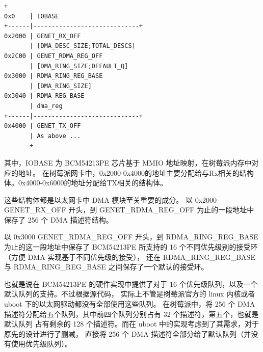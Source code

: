     \begin{minipage}[t]{0.42\linewidth}
    \begin{lstlisting}[columns=fullflexible, label={fig::uboot-genet-struct}]       +
0x0    | IOBASE
+------|-----------------------------+
0x2000 | GENET_RX_OFF
       | [DMA_DESC_SIZE;TOTAL_DESCS]
0x2C00 | GENET_RDMA_REG_OFF
       | [DMA_RING_SIZE;DEFAULT_Q]
0x3000 | RDMA_RING_REG_BASE
       | [DMA_RING_SIZE]
0x3040 | RDMA_REG_BASE
       | dma_reg
+------|-----------------------------+
0x4000 | GENET_TX_OFF
       | As above ...
       +
        \end{lstlisting}
    \end{minipage}
    \quad
    \begin{minipage}[t]{0.5\linewidth}
        \vspace{2em}
        \setlength{\parindent}{1em}
        其中，IOBASE 为 BCM54213PE 芯片基于 MMIO 地址映射，在树莓派内存中对应的地址。
        在树莓派网卡中，0x2000-0x4000的地址主要分配给与Rx相关的结构体。0x4000-0x6000的地址分配给TX相关的结构体。

        这些结构体都是以太网卡中 DMA 模块至关重要的成分。
        以 0x2000 GENET\_RX\_OFF 开头，到 GENET\_RDMA\_REG\_OFF 为止的一段地址中保存了 256 个 DMA 描述符结构。
    \end{minipage}

    以 0x3000 GENET\_RDMA\_REG\_OFF 开头，到 RDMA\_RING\_REG\_BASE 为止的这一段地址中保存了 BCM54213PE 
    所支持的 16 个不同优先级别的接受环（方便 DMA 实现基于不同优先级的接受），
    还在 RDMA\_RING\_REG\_BASE 与 RDMA\_RING\_REG\_BASE 之间保存了一个默认的接受环。

    也就是说在 BCM54213PE 的硬件实现中提供了对于 16 个优先级队列，以及一个默认队列的支持。不过根据源代码，
    实际上不管是树莓派官方的 linux 内核或者 uboot 下的以太网驱动都没有全部使用这些队列。
    在树莓派中，将 256 个 DMA 描述符分配给五个队列，其中前四个队列分别占有 32 个描述符，第五个，也就是默认队列
    占有剩余的 128 个描述符。而在 uboot 中的实现考虑到了其需求，对于原先的设计进行了删减，
    直接将 256 个 DMA 描述符全部分给了默认队列（并没有使用优先级队列）。
    
